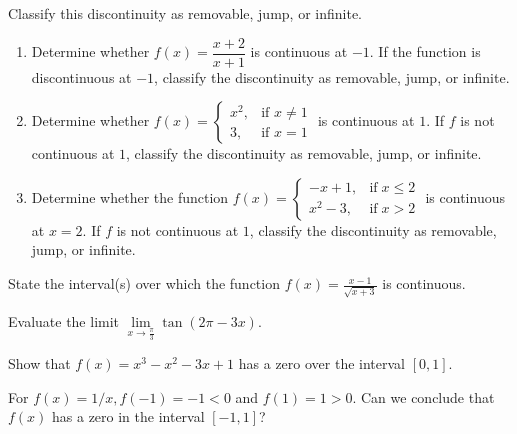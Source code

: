 \begin{exercise}

Classify this discontinuity as removable, jump, or infinite.

\begin{enumerate}
\item
  Determine whether \(f(x)=\dfrac{x+2}{x+1}\) is continuous at \(-1\).
  If the function is discontinuous at \(-1\), classify the discontinuity
  as removable, jump, or infinite.
\item
  Determine whether
  \(f(x)=\begin{cases}x^2, &\text{if }x\ne 1\\3, & \text{if }x=1\end{cases}\)
  is continuous at \(1\). If \(f\) is not continuous at \(1\), classify
  the discontinuity as removable, jump, or infinite.
\item
  Determine whether the function
  \(f(x)=\begin{cases}-x+1, & \mathrm{if} \; x\le 2 \\ x^2-3, & \mathrm{if} \; x>2\end{cases}\)
  is continuous at \(x=2\). If \(f\) is not continuous at \(1\),
  classify the discontinuity as removable, jump, or infinite.
\end{enumerate}

\end{exercise}

\begin{exercise}

State the interval(s) over which the function
\(f(x)=\frac{x-1}{\sqrt{x+3}}\) is continuous.

\end{exercise}
\vspace*{6\baselineskip}

\begin{exercise}

Evaluate the limit \(\lim\limits_{x\to \frac\pi3}\tan(2\pi-3x)\).

\end{exercise}
\vspace*{6\baselineskip}

\begin{exercise}

Show that \(f(x)=x^3-x^2-3x+1\) has a zero over the interval \([0,1]\).

\end{exercise}
\vspace*{6\baselineskip}

\begin{exercise}

For \(f(x)=1/x,f(-1)=-1<0\) and \(f(1)=1>0\). Can we conclude that
\(f(x)\) has a zero in the interval \([-1,1]\)?

\end{exercise}
